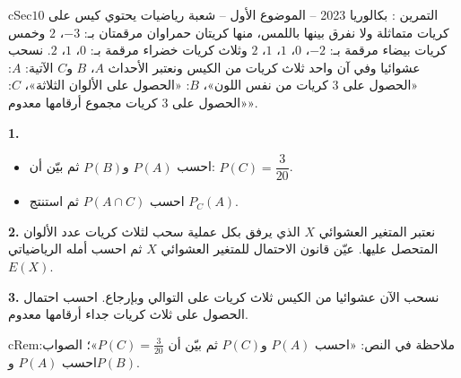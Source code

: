 \documentclass[12pt,a4paper]{article}
\newenvironment{BOX}[2]{\begin{otherlanguage}{english}\begin{arbox}{#1}{#2}}{\end{arbox}\end{otherlanguage}}
\newenvironment{molahada}[1][ملاحظة]{\begin{BOX}{cRem}{#1}}{\end{BOX}}
\newcounter{exo}
\newenvironment{tamrin}[1]{\stepcounter{exo}\begin{BOX}{cSec}{التمرين \theexo: #1}}{\end{BOX}}
\newenvironment{sq}{\begin{itemize}[leftmargin=2.4em,itemsep=3pt]}{\end{itemize}}
\newcommand{\qa}{\item[(أ)]}\newcommand{\qb}{\item[(ب)]}\newcommand{\qc}{\item[(جـ)]}\newcommand{\qd}{\item[(د)]}\newcommand{\qe}{\item[(هـ)]}
\newcommand{\QQ}[1]{\par\smallskip\textbf{#1.} }
\begin{document}
\begin{tamrin}{بكالوريا 2023 -- الموضوع الأول -- شعبة رياضيات}
يحتوي كيس على $10$ كريات متماثلة ولا نفرق بينها باللمس، منها كريتان حمراوان مرقمتان بـ: $-3$، $2$ وخمس كريات بيضاء مرقمة بـ: $-2$، $0$، $1$، $1$، $2$ وثلاث كريات خضراء مرقمة بـ: $0$، $1$، $2$.
نسحب عشوائيا وفي آن واحد ثلاث كريات من الكيس ونعتبر الأحداث $A$، $B$ و$C$ الآتية:
$A$: «الحصول على $3$ كريات من نفس اللون»، $B$: «الحصول على الألوان الثلاثة»، $C$: «الحصول على $3$ كريات مجموع أرقامها معدوم».

\QQ{1}
\begin{sq}
\qa احسب $P(A)$ و$P(B)$ ثم بيّن أن: $P(C)=\dfrac{3}{20}$.
\qb احسب $P(A\cap C)$ ثم استنتج $P_C(A)$.
\end{sq}
\QQ{2} نعتبر المتغير العشوائي $X$ الذي يرفق بكل عملية سحب لثلاث كريات عدد الألوان المتحصل عليها.
عيّن قانون الاحتمال للمتغير العشوائي $X$ ثم احسب أمله الرياضياتي $E(X)$.
\QQ{3} نسحب الآن عشوائيا من الكيس ثلاث كريات على التوالي وبإرجاع.
احسب احتمال الحصول على ثلاث كريات جداء أرقامها معدوم.
\end{tamrin}
\begin{molahada}
في النص: «احسب $P(A)$ و$P(C)$ ثم بيّن أن $P(C)=\frac{3}{20}$»؛ الصواب: احسب $P(A)$ و$P(B)$.
\end{molahada}
\end{document}
